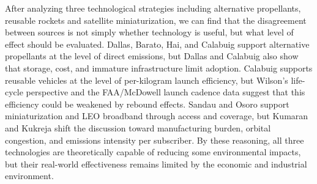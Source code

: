 \documentclass[12pt]{article}
\begin{document}
After analyzing three technological strategies including alternative propellants, reusable rockets and satellite miniaturization, we can find that the disagreement between sources is not simply whether technology is useful, but what level of effect should be evaluated. Dallas, Barato, Hai, and Calabuig support alternative propellants at the level of direct emissions, but Dallas and Calabuig also show that storage, cost, and immature infrastructure limit adoption. Calabuig supports reusable vehicles at the level of per-kilogram launch efficiency, but Wilson's life-cycle perspective and the FAA/McDowell launch cadence data suggest that this efficiency could be weakened by rebound effects. Sandau and Osoro support miniaturization and LEO broadband through access and coverage, but Kumaran and Kukreja shift the discussion toward manufacturing burden, orbital congestion, and emissions intensity per subscriber. By these reasoning, all three technologies are theoretically capable of reducing some environmental impacts, but their real-world effectiveness remains limited by the economic and industrial environment.
\end{document}
